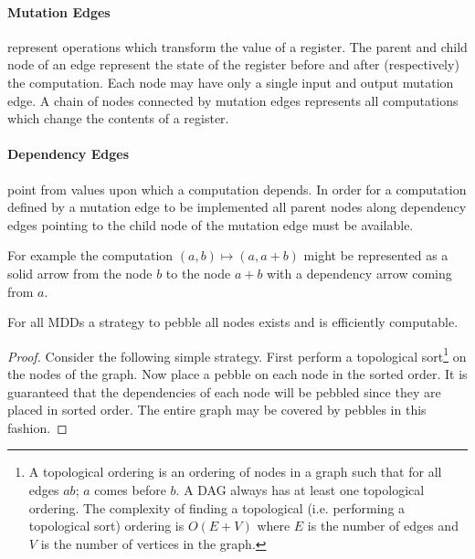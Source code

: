 \paragraph{Mutation Edges} represent operations which transform the value
of a register. The parent and child node of an edge represent the state of the
register before and after (respectively) the computation. Each node may have
only a single input and output mutation edge. A chain of nodes connected by
mutation edges represents all computations which change the contents of a
register.

\paragraph{Dependency Edges} point from values upon which a computation
depends. In order for a computation defined by a mutation edge to be implemented
all parent nodes along dependency edges pointing to the child node of the
mutation edge must be available.

For example the computation $(a,b)\mapsto(a,a+b)$ might be represented as a
solid arrow from the node $b$ to the node $a+b$ with a dependency arrow coming
from $a$.


\begin{theorem} For all MDDs a strategy to pebble all nodes exists and is
efficiently computable. \end{theorem}

\begin{proof} Consider the following simple strategy. First perform a
topological sort\footnote{A topological ordering is an ordering of nodes in
a graph such that for all edges $ab$; $a$ comes before $b$. A DAG
always has at least one topological ordering. The complexity of finding
a topological (i.e. performing a topological sort) ordering is $O(E+V)$
where $E$ is the number of edges and $V$ is the number of vertices in the
graph.} on the nodes of the graph. Now place a pebble on each node in the
sorted order. It is guaranteed that the dependencies of each node will be
pebbled since they are placed in sorted order. The entire graph may be covered
by pebbles in this fashion.\end{proof}




